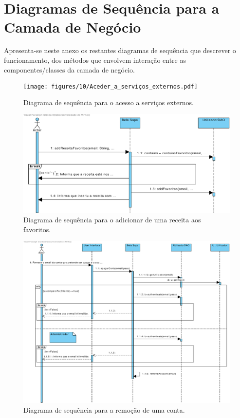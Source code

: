 
\section{Diagramas de Sequência para a Ca\-ma\-da de Negócio}
\label{ane:negocio-diag-seq}

Apresenta-se neste anexo os restantes diagramas de sequência que descrever o funcionamento, dos métodos que envolvem interação entre as componentes/classes da camada de negócio.

\begin{figure}[ht]
   \centering
   \texttt{[image: figures/10/Aceder\_a\_serviços\_externos.pdf]}
   \caption{Diagrama de sequência para o acesso a serviços externos.}
   \label{fig:negocio:DiagramaSequencia3}
 \end{figure}
 
 \begin{figure}[ht]
   \centering
   \includegraphics[width=\textwidth]{figures/10/Adicionar_receita_favoritos.pdf}
   \caption{Diagrama de sequência para o adicionar de uma receita aos favoritos.}
   \label{fig:negocio:DiagramaSequencia4}
 \end{figure}
 
 \begin{figure}[ht]
   \centering
   \includegraphics[width=\textwidth]{figures/10/Apagar_Conta.pdf}
   \caption{Diagrama de sequência para a remoção de uma conta.}
   \label{fig:negocio:DiagramaSequencia5}
 \end{figure}
 

